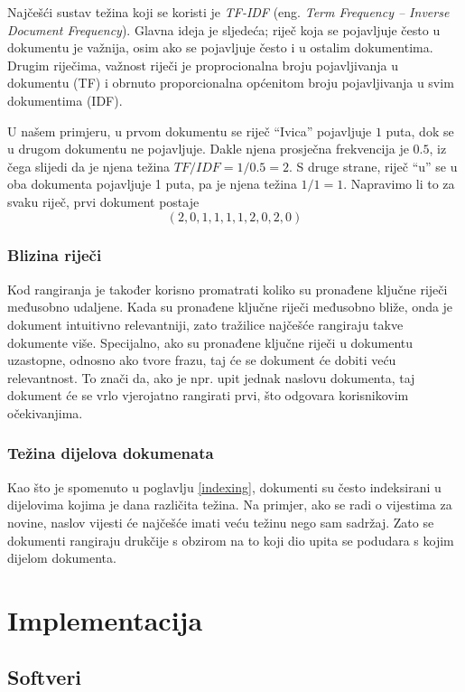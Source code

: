 \documentclass[a4paper,twoside,12pt]{scrreprt}
\begin{document}
Najčešći sustav težina koji se koristi je \textit{TF-IDF} (eng. \textit{Term Frequency – Inverse Document Frequency}). Glavna ideja je sljedeća; riječ koja se pojavljuje često u dokumentu je važnija, osim ako se pojavljuje često i u ostalim dokumentima. Drugim riječima, važnost riječi je proprocionalna broju pojavljivanja u dokumentu (TF) i obrnuto proporcionalna općenitom broju pojavljivanja u svim dokumentima (IDF).

U našem primjeru, u prvom dokumentu se riječ ``Ivica'' pojavljuje $1$ puta, dok se u drugom dokumentu ne pojavljuje. Dakle njena prosječna frekvencija je $0.5$, iz čega slijedi da je njena težina $TF / IDF = 1 / 0.5 = 2$. S druge strane, riječ ``u'' se u oba dokumenta pojavljuje 1 puta, pa je njena težina $1 / 1 = 1$. Napravimo li to za svaku riječ, prvi dokument postaje $$(2,0,1,1,1,1,2,0,2,0)$$

\subsection{Blizina riječi}

Kod rangiranja je također korisno promatrati koliko su pronađene ključne riječi međusobno udaljene. Kada su pronađene ključne riječi međusobno bliže, onda je dokument intuitivno relevantniji, zato tražilice najčešće rangiraju takve dokumente više. Specijalno, ako su pronađene ključne riječi u dokumentu uzastopne, odnosno ako tvore frazu, taj će se dokument će dobiti veću relevantnost. To znači da, ako je npr. upit jednak naslovu dokumenta, taj dokument će se vrlo vjerojatno rangirati prvi, što odgovara korisnikovim očekivanjima.

\subsection{Težina dijelova dokumenata}

Kao što je spomenuto u poglavlju \ref{indexing}, dokumenti su često indeksirani u dijelovima kojima je dana različita težina. Na primjer, ako se radi o vijestima za novine, naslov vijesti će najčešće imati veću težinu nego sam sadržaj. Zato se dokumenti rangiraju drukčije s obzirom na to koji dio upita se podudara s kojim dijelom dokumenta.

\chapter{Implementacija}

\section{Softveri}
\end{document}

